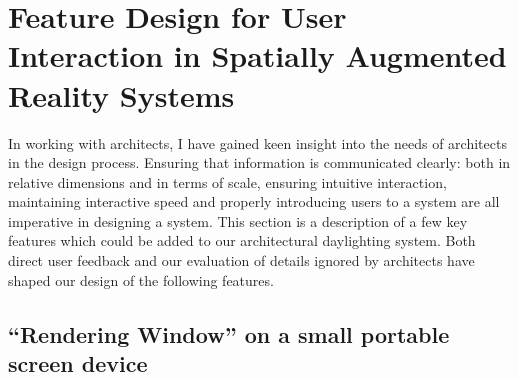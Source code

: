\chapter{Feature Design for User Interaction in Spatially Augmented Reality Systems}


In working with architects, I have gained keen insight into the needs of architects in the design process.  Ensuring that information is communicated clearly: both in relative dimensions and in terms of scale, ensuring intuitive interaction, maintaining interactive speed and properly introducing users to a system are all imperative in designing a system.  This section is a description of a few key features which could be added to our architectural daylighting system.  Both direct user feedback and our evaluation of details ignored by architects have shaped our design of the  following features.

\section{``Rendering Window'' on a small portable screen device}

